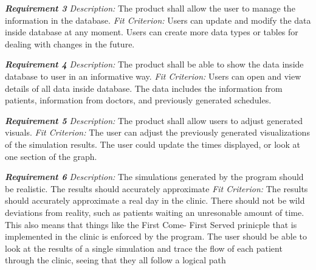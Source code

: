 \documentclass[12pt, titlepage]{article}
\begin{document}
\noindent\textbf{\textit{Requirement 3}}\newline
\textit{Description:}\newline
The product shall allow the user to manage the information in the database. \newline\newline
\textit{Fit Criterion:}\newline 
Users can update and modify the data inside database at any moment. Users can create more data types or tables for dealing with changes in the future.
\newline

\noindent\textbf{\textit{Requirement 4}}\newline
\textit{Description:}\newline
The product shall be able to show the data inside database to user in an informative way. \newline\newline
\textit{Fit Criterion:}\newline 
Users can open and view details of all data inside database. The data includes the information from patients, information from doctors, and previously generated schedules. \newline

\noindent\textbf{\textit{Requirement 5}}\newline
\textit{Description:}\newline
The product shall allow users to adjust generated visuals. \newline\newline
\textit{Fit Criterion:}\newline 
The user can adjust the previously generated visualizations of the simulation results. The user could update the times displayed, or look at one section of the graph. \newline

\noindent\textbf{\textit{Requirement 6}}\newline
\textit{Description:}\newline
The simulations generated by the program should be realistic. The results should accurately approximate
 \newline\newline
\textit{Fit Criterion:}\newline 
The results should accurately approximate a real day in the clinic. There should not be wild deviations from reality, such as patients waiting an unresonable amount of time. This also means that things like the First Come- First Served prinicple that is implemented in the clinic is enforced by the program. The user should be able to look at the results of a single simulation and trace the flow of each patient through the clinic, seeing that they all follow a logical path\newline
\end{document}
